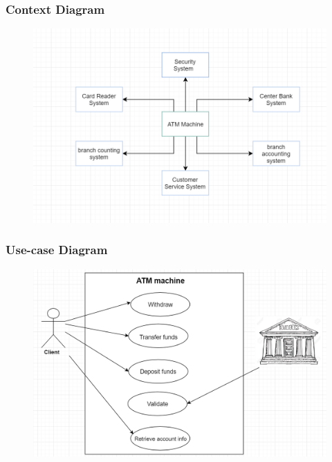 \documentclass{article}
\begin{document}
	\subsubsection{Context Diagram}
		\begin{figure}[h!]
			\begin{center}
				\includegraphics[width=\linewidth]{img/context.png}
			\end{center}
		\end{figure}	
	\newpage\subsubsection{Use-case Diagram}
		\begin{figure}[h!]
			\begin{center}
				\includegraphics[width=\linewidth]{img/usecase.png}
			\end{center}
		\end{figure}
\end{document}
